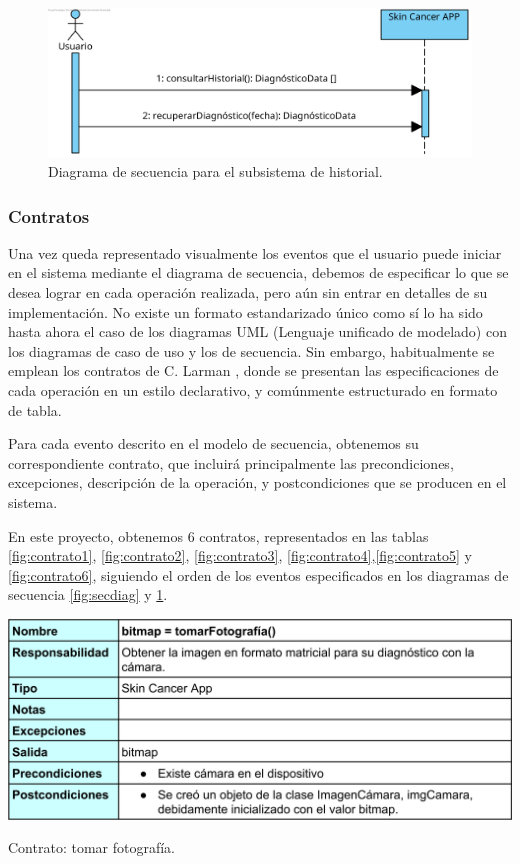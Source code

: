 \begin{figure}[H]
	\centering
	\includegraphics[scale = 1]{imagenes/DiagramaSecuenciaHistorial.png}
	\caption{Diagrama de secuencia para el subsistema de historial.}
	\label{fig:sechistorial}
\end{figure}

 \subsubsection{Contratos}
 
 Una vez queda representado visualmente los eventos que el usuario puede iniciar en el sistema mediante el diagrama de secuencia, debemos	de especificar lo que se desea lograr en cada operación realizada, pero aún sin entrar en detalles de su implementación. No existe un formato estandarizado único como sí lo ha sido hasta ahora el caso de los diagramas UML (Lenguaje unificado de modelado) con los diagramas de caso de uso y los de secuencia. Sin embargo, habitualmente se emplean los contratos de C. Larman \cite{larman2003uml}, donde se presentan las especificaciones de cada operación en un estilo declarativo, y comúnmente estructurado en formato de tabla.
 
 Para cada evento descrito en el modelo de secuencia, obtenemos su correspondiente contrato, que incluirá principalmente las precondiciones, excepciones, descripción de la operación, y postcondiciones que se producen en el sistema.
 
 En este proyecto, obtenemos 6 contratos, representados en las tablas \ref{fig:contrato1}, \ref{fig:contrato2}, \ref{fig:contrato3}, \ref{fig:contrato4},\ref{fig:contrato5} y \ref{fig:contrato6}, siguiendo el orden de los eventos especificados en los diagramas de secuencia \ref{fig:secdiag} y \ref{fig:sechistorial}.
 
 \begin{table}[H]
 	\centering
 	\includegraphics[scale = 0.16]{imagenes/contrato1.png}
 	\caption{Contrato: tomar fotografía.}
 	\label{fig:contrato1}
 \end{table}
 
